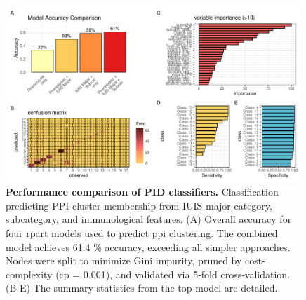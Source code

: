\begin{figure}[ht]
  \centering
  \includegraphics[width=0.99\textwidth]{../images/plot_multicat_performance_combined.pdf}
  \caption{\textbf{Performance comparison of PID classifiers.} Classification predicting PPI cluster membership from IUIS major category, subcategory, and immunological features. (A) Overall accuracy for four rpart models
used to predict \ac{ppi} clustering. The combined model achieves 61.4 \% accuracy, exceeding all simpler approaches. 
Nodes were split to minimize Gini impurity, pruned by cost-complexity (cp = 0.001), and validated via 5‑fold cross‑validation. %
(B-E) The summary statistics from the top model are detailed.  
}
  \label{fig:multicat_performance_combined}
\end{figure}

